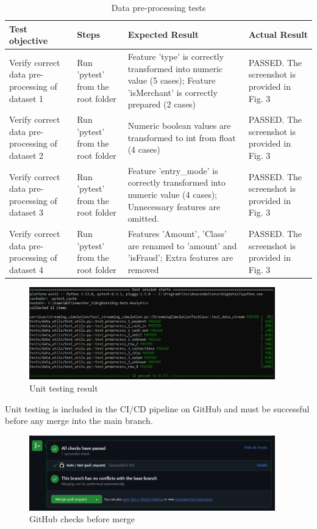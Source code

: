 \documentclass[12pt,a4paper, hidelinks]{article}
\begin{document}
\begin{table}[htbp]
\centering
\begin{tabular}{|p{3cm}|p{2cm}|p{4cm}|p{5cm}|}
\hline
\textbf{Test objective} & \textbf{Steps} & \textbf{Expected Result} & \textbf{Actual Result} \\
\hline
Verify correct data pre-processing of dataset 1 & Run 'pytest' from the root folder & Feature 'type' is correctly transformed into numeric value (5 cases); Feature 'isMerchant' is correctly prepared (2 cases) & PASSED. The screenshot is provided in Fig. 3 \\
\hline
Verify correct data pre-processing of dataset 2 & Run 'pytest' from the root folder & Numeric boolean values are transformed to int from float (4 cases) & PASSED. The screenshot is provided in Fig. 3 \\
\hline
Verify correct data pre-processing of dataset 3 & Run 'pytest' from the root folder & Feature 'entry\_mode' is correctly transformed into numeric value (4 cases); Unnecessary features are omitted. & PASSED. The screenshot is provided in Fig. 3 \\
\hline
Verify correct data pre-processing of dataset 4 & Run 'pytest' from the root folder & Features 'Amount', 'Class' are renamed to 'amount' and 'isFraud'; Extra features are removed & PASSED. The screenshot is provided in Fig. 3 \\
\hline
\end{tabular}
\caption{Data pre-processing tests}
\end{table}

\begin{figure}[htbp]
  \centering
  \includegraphics[width=0.95\textwidth]{images/unittests-M2.png}
  \caption{Unit testing result}
  \label{fig:sunset}
\end{figure}

Unit testing is included in the CI/CD pipeline on GitHub and must be successful before any merge into the main branch.

\begin{figure}[htbp]
  \centering
  \includegraphics[width=0.95\textwidth]{images/github-checks-M2.PNG}
  \caption{GitHub checks before merge}
  \label{fig:sunset}
\end{figure}
\end{document}
